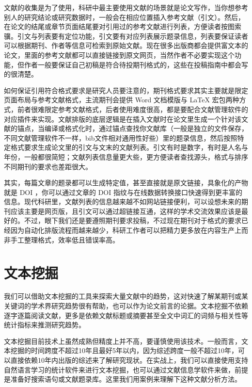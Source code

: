 \documentclass[]{tufte-book}
\begin{document}
文献的收集是为了使用，科研中最主要使用文献的场景就是论文写作，当你想参考别人的研究结论或研究数据时，一般会在相应位置插入参考文献（引文）。然后，在论文的结尾或章节页面结尾要对引用过的参考文献进行列表，方便读者按图索骥。引文与列表要有定位功能，引文要有对应列表展示题录信息，列表要保证读者可以根据期刊、作者等信息可检索到原始文献。现在很多出版商都会提供富文本的论文，里面的参考文献都可以直接链接到原文网页，当然作者不必要实现这个功能，但作者一般要保证自己初稿是符合待投期刊格式的，这些在投稿指南中都会写的很清楚。

如何保证引用符合格式要求是研究人员要注意的，期刊格式要求其实主要就是限定页面布局与参考文献格式，主流期刊会提供 Word 文档模版与 LaTeX 宏包两种方式，前者很难限定参考文献格式，后者使用难度很高，都是要配合文献管理软件的对应插件来实现。文献排版的底层逻辑是在插入文献时在论文里生成一个针对该文献的锚点，当编译或格式化时，通过锚点查找你文献库（一般是独立的文件保存，不同文献管理软件不一样，bib文件相对通用性好些）里的题录信息，然后按照特定格式要求生成论文里的引文与文末的文献列表。引文有时是数字，有时是人名与年份，一般都很简短；文献列表信息量更大些，更方便读者查找源头，格式与排序不同期刊的要求也差距很大。

其实，每篇文章的题录都可以生成特定值，甚至直接就是原文链接，具象化的产物就是 DOI ，你可以通过文章的 DOI 指纹与在线数据转换接口快速得到更丰富的信息。现代科研里，文献列表的信息越来越不如网站链接便利，可以设想未来的期刊应该主要是网页版，且引文可以通过超链接互通，这样的学术交流效果应该是最好的。不过，眼下我们还是要遵照期刊要求投稿，不过现在期刊对于格式的要求已经因为自动化排版流程而越来越少，科研工作者可以把精力更多放在内容生产上而非手工整理格式，效率低且错误率高。

\hypertarget{ux6587ux672cux6316ux6398}{%
\section{文本挖掘}\label{ux6587ux672cux6316ux6398}}

我们可以借助文本挖掘的工具来探索大量文献中的趋势，这对快速了解某期刊或某关键词的学术界研究趋势很有帮助，也可以作为论文前言的论据。文本挖掘不依赖逐字逐篇阅读文献，更多是依赖文献标题或摘要甚至全文中词汇的词频与相关性等统计指标来推测研究趋势。

文本挖掘目前技术上虽然成熟但精度上并不高，要谨慎使用该技术。一般而言，文本挖掘的时间跨度不超过10年且最好5年以内，因为综述跨度一般不超过10年，可以直接依赖10年内出版的综述来了解研究现状。在实战上，我们可以直接使用支持自然语言学习的统计软件来进行文本挖掘，也可以通过文献信息学软件来做，前提是准备好搜索语句或文献题录库。这里我们用案例来理解下这种文献分析方法。
\end{document}
